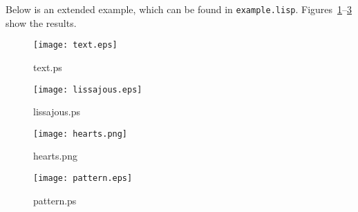 \documentclass[12pt,letterpaper,dvipdfm]{article}
\begin{document}
Below is an extended example, which can be found in
\texttt{example.lisp}.  Figures~\ref{fig:text}--\ref{fig:hearts} show
the results.



\begin{figure}[htbp]
  \centering
  \texttt{[image: text.eps]}
  \caption{text.ps}
  \label{fig:text}
\end{figure}

\begin{figure}[htbp]
  \centering
  \texttt{[image: lissajous.eps]}
  \caption{lissajous.ps}
  \label{fig:lissajous}
\end{figure}

\begin{figure}[htbp]
  \centering
  \texttt{[image: hearts.png]}
  \caption{hearts.png}
  \label{fig:hearts}
\end{figure}

\begin{figure}[htbp]
  \centering
  \texttt{[image: pattern.eps]}
  \caption{pattern.ps}
  \label{fig:pattern}
\end{figure}
\end{document}
